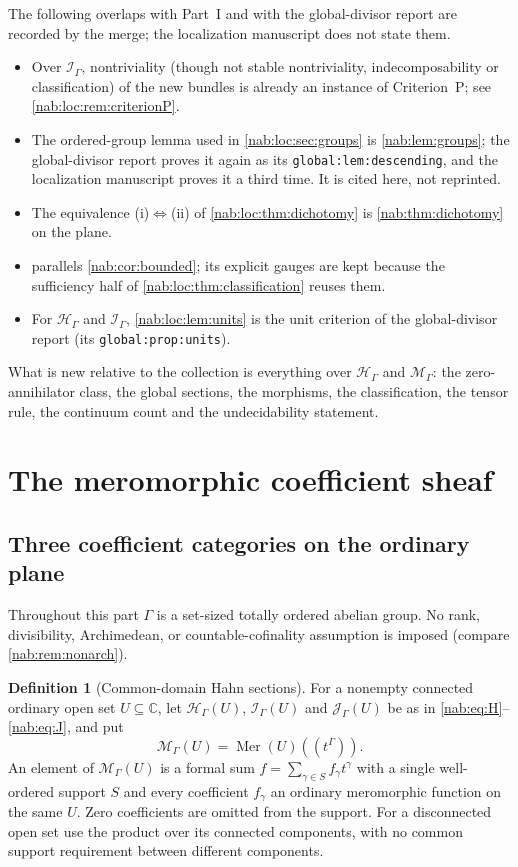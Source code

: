 \documentclass[11pt,letterpaper]{article}
\theoremstyle{definition}
\newtheorem{definition}[definition]{Definition}
\theoremstyle{remark}
\newcommand{\C}{\mathbb C}
\newcommand{\HH}{\mathscr H_\Gamma}
\newcommand{\II}{\mathscr I_\Gamma}
\newcommand{\JJ}{\mathscr J_\Gamma}
\newcommand{\MM}{\mathscr M_\Gamma}
\newcommand{\Mer}{\operatorname{Mer}}
\numberwithin{equation}{section}
\begin{document}
The following overlaps with Part~I and with the global-divisor report are
recorded by the merge; the localization manuscript does not state them.
\begin{itemize}
\item Over $\II$, nontriviality (though not stable nontriviality,
indecomposability or classification) of the new bundles is already an
instance of Criterion~P; see \cref{nab:loc:rem:criterionP}.
\item The ordered-group lemma used in \cref{nab:loc:sec:groups} is
\cref{nab:lem:groups}; the global-divisor report proves it again as its
\texttt{global:lem:descending}, and the localization manuscript proves it a
third time. It is cited here, not reprinted.
\item The equivalence (i)$\Leftrightarrow$(ii) of \cref{nab:loc:thm:dichotomy}
is \cref{nab:thm:dichotomy} on the plane.
\item {} parallels \cref{nab:cor:bounded}; its
explicit gauges are kept because the sufficiency half of
\cref{nab:loc:thm:classification} reuses them.
\item For $\HH$ and $\II$, \cref{nab:loc:lem:units} is the unit criterion of
the global-divisor report (its \texttt{global:prop:units}).
\end{itemize}
What is new relative to the collection is everything over $\HH$ and $\MM$: the
zero-annihilator class, the global sections, the morphisms, the
classification, the tensor rule, the continuum count and the undecidability
statement.

\section{The meromorphic coefficient sheaf}\label{nab:loc:sec:coefficients}

\subsection{Three coefficient categories on the ordinary plane}

Throughout this part $\Gamma$ is a set-sized totally ordered abelian group. No
rank, divisibility, Archimedean, or countable-cofinality assumption is imposed
(compare \cref{nab:rem:nonarch}).

\begin{definition}[Common-domain Hahn sections]\label{nab:loc:def:sheaves}
For a nonempty connected ordinary open set $U\subseteq\C$, let $\HH(U)$,
$\II(U)$ and $\JJ(U)$ be as in \eqref{nab:eq:H}--\eqref{nab:eq:J}, and put
\begin{equation}\label{nab:loc:eq:M}
 \MM(U)=\Mer(U)((t^\Gamma)).
\end{equation}
An element of $\MM(U)$ is a formal sum $f=\sum_{\gamma\in S}f_\gamma t^\gamma$
with a single well-ordered support $S$ and every coefficient $f_\gamma$ an
ordinary meromorphic function on the same $U$. Zero coefficients are omitted
from the support. For a disconnected open set use the product over its
connected components, with no common support requirement between different
components.
\end{definition}
\end{document}
